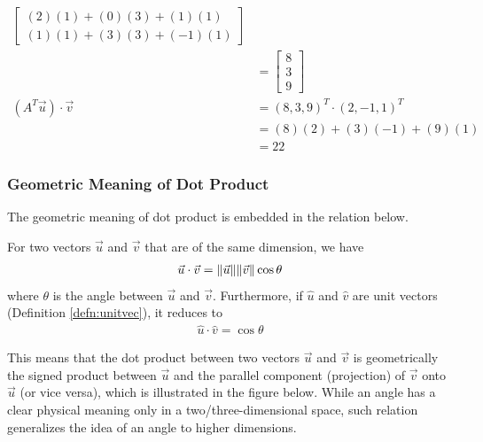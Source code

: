 \begin{solution}
\begin{align*}
\begin{bmatrix}
(2)(1) + (0)(3) + (1)(1) \\
(1)(1) + (3)(3) + (-1)(1) 
\end{bmatrix} \\
&=
\begin{bmatrix}
8 \\
3 \\
9
\end{bmatrix} \\
(A^T\vec{u}) \cdot \vec{v} &= (8,3,9)^T \cdot (2,-1,1)^T \\
&= (8)(2) + (3)(-1) + (9)(1) \\
&= 22
\end{align*}
\end{solution}

\subsubsection{Geometric Meaning of Dot Product}
The geometric meaning of dot product is embedded in the relation below.
\begin{proper}
\label{proper:dotgeo}
For two vectors $\vec{u}$ and $\vec{v}$ that are of the same dimension, we have
\begin{align*}
\vec{u} \cdot \vec{v} = \norm{\vec{u}}\norm{\vec{v}}\cos\theta
\end{align*}
where $\theta$ is the angle between $\vec{u}$ and $\vec{v}$. Furthermore, if $\hat{u}$ and $\hat{v}$ are unit vectors (Definition \ref{defn:unitvec}), it reduces to
\begin{align*}
\hat{u} \cdot \hat{v} = \cos\theta    
\end{align*}
\end{proper}
This means that the dot product between two vectors $\vec{u}$ and $\vec{v}$ is geometrically the signed product between $\vec{u}$ and the parallel component (projection) of $\vec{v}$ onto $\vec{u}$ (or vice versa), which is illustrated in the figure below. While an angle has a clear physical meaning only in a two/three-dimensional space, such relation generalizes the idea of an angle to higher dimensions.
\begin{center}
\end{center}
